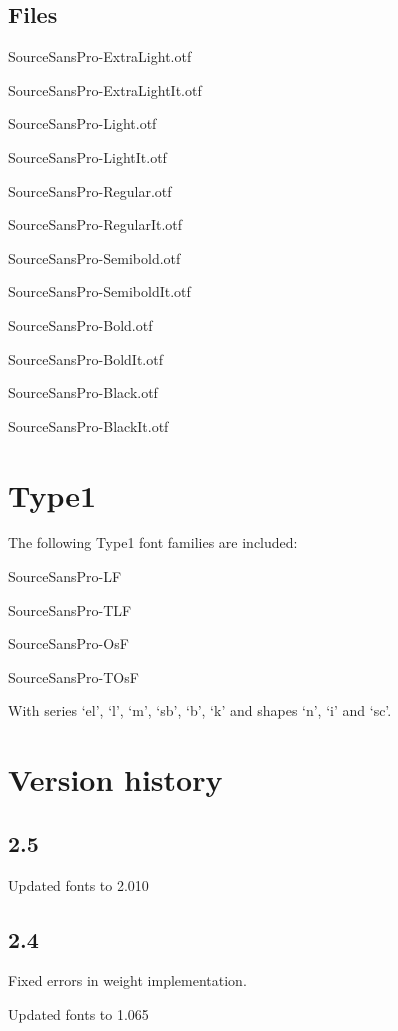 \documentclass[10pt,a4paper,english]{article}
\begin{document}
\begin{multicols}{2}
\subsection{Files}
\begin{itemize*}
	\item SourceSansPro-ExtraLight.otf
	\item SourceSansPro-ExtraLightIt.otf
	\item SourceSansPro-Light.otf
	\item SourceSansPro-LightIt.otf
	\item SourceSansPro-Regular.otf
	\item SourceSansPro-RegularIt.otf
	\item SourceSansPro-Semibold.otf
	\item SourceSansPro-SemiboldIt.otf
	\item SourceSansPro-Bold.otf
	\item SourceSansPro-BoldIt.otf
	\item SourceSansPro-Black.otf
	\item SourceSansPro-BlackIt.otf
\end{itemize*}

\section{Type1}
The following Type1 font families are included:
\begin{itemize*}
	\item SourceSansPro-LF
	\item SourceSansPro-TLF
	\item SourceSansPro-OsF
	\item SourceSansPro-TOsF
\end{itemize*}
With series ‘el’, ‘l’, ‘m’, ‘sb’, ‘b’, ‘k’ and shapes ‘n’, ‘i’ and ‘sc’.

\section{Version history}
\subsection*{2.5}
\begin{itemize*}
	\item Updated fonts to 2.010
\end{itemize*}

\subsection*{2.4}
\begin{itemize*}
	\item Fixed errors in weight implementation.
	\item Updated fonts to 1.065
\end{itemize*}


\end{multicols}
\end{document}
